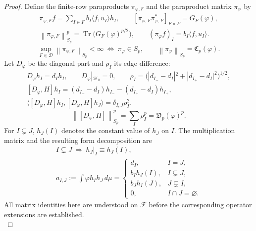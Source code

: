 \documentclass[11pt]{amsart}
\newcommand{\D}{\mathcal D}
\newcommand{\tr}{\operatorname{Tr}}
\newcommand{\ip}[2]{\langle #1,#2\rangle}
\newcommand{\norm}[1]{\left\|#1\right\|}
\newcommand{\fin}{\Subset}
\begin{document}
\begin{proof}
Define the finite-row paraproducts $\pi_{\varphi,F}$ and the
paraproduct matrix $\pi_\varphi$ by
\begin{gather*}
 \pi_{\varphi,F}f=\sum_{I\in F}b_I\ip{f}{u_I}h_I,\qquad
 [\pi_{\varphi,F}\pi_{\varphi,F}^*]_{F\times F}=G_F(\varphi),\\
 \norm{\pi_{\varphi,F}}_{S_p}^p
        =\tr\big(G_F(\varphi)^{p/2}\big),\qquad
 (\pi_\varphi f)_I=b_I\ip{f}{u_I}.
\end{gather*}
\begin{equation}\label{pi-norm}
 \sup_{F\fin\D}\norm{\pi_{\varphi,F}}_{S_p}<\infty
 \ \Longleftrightarrow\ \pi_\varphi\in S_p,\qquad
 \norm{\pi_\varphi}_{S_p}=\mathfrak C_p(\varphi).
\end{equation}
Let $D_\varphi$ be the diagonal part and $\rho_I$ its edge difference:
\begin{gather*}
 D_\varphi h_I=d_Ih_I,\qquad D_\varphi|_{\mathcal H_0}=0,\qquad
 \rho_I=\big(|d_{I_-}-d_I|^2+|d_{I_+}-d_I|^2\big)^{1/2},\\
 [D_\varphi,H]h_I
       =(d_{I_-}-d_I)h_{I_-}-(d_{I_+}-d_I)h_{I_+},\\
 \ip{[D_\varphi,H]h_I}{[D_\varphi,H]h_J}
                  =\delta_{I,J}\rho_I^2.
\end{gather*}
\begin{equation}\label{D-norm}
 \norm{[D_\varphi,H]}_{S_p}^p=\sum_I\rho_I^p
                         =\mathfrak D_p(\varphi)^p.
\end{equation}
For $I\subsetneq J$, $h_J(I)$ denotes the constant value of $h_J$ on
$I$. The multiplication matrix and the resulting form decomposition
are
\begin{equation}\label{multiplication-matrix}
 \begin{gathered}
 I\subsetneq J\ \Longrightarrow\ h_J|_I\equiv h_J(I),\\
 a_{I,J}:=\int\varphi h_Ih_J\,d\mu=
 \begin{cases}
 d_I,&I=J,\\
 b_I h_J(I),&I\subsetneq J,\\
 b_J h_I(J),&J\subsetneq I,\\
 0,&I\cap J=\varnothing.
 \end{cases}
 \end{gathered}
\end{equation}
All matrix identities here are understood on $\mathscr F$ before the
corresponding operator extensions are established.
\begin{equation}\label{decompose}

\end{equation}
\end{proof}
\end{document}
